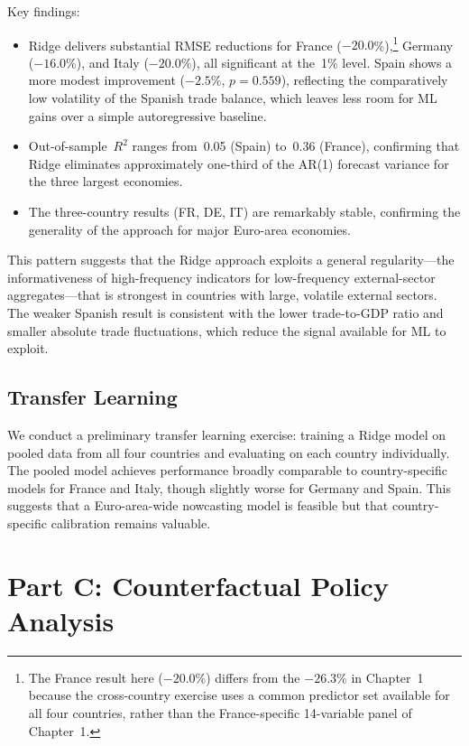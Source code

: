 Key findings:
\begin{itemize}
  \item Ridge delivers substantial RMSE reductions for France ($-20.0$\%),\footnote{The France result here ($-20.0$\%) differs from the $-26.3$\% in Chapter~1 because the cross-country exercise uses a common predictor set available for all four countries, rather than the France-specific 14-variable panel of Chapter~1.} Germany ($-16.0$\%), and Italy ($-20.0$\%), all significant at the~1\% level.  Spain shows a more modest improvement ($-2.5$\%, $p = 0.559$), reflecting the comparatively low volatility of the Spanish trade balance, which leaves less room for ML gains over a simple autoregressive baseline.
  \item Out-of-sample~$R^2$ ranges from~0.05 (Spain) to~0.36 (France), confirming that Ridge eliminates approximately one-third of the AR(1) forecast variance for the three largest economies.
  \item The three-country results (FR, DE, IT) are remarkably stable, confirming the generality of the approach for major Euro-area economies.
\end{itemize}

This pattern suggests that the Ridge approach exploits a general regularity---the informativeness of high-frequency indicators for low-frequency external-sector aggregates---that is strongest in countries with large, volatile external sectors.  The weaker Spanish result is consistent with the lower trade-to-GDP ratio and smaller absolute trade fluctuations, which reduce the signal available for ML to exploit.

\subsection{Transfer Learning}

We conduct a preliminary transfer learning exercise: training a Ridge model on pooled data from all four countries and evaluating on each country individually.  The pooled model achieves performance broadly comparable to country-specific models for France and Italy, though slightly worse for Germany and Spain.  This suggests that a Euro-area-wide nowcasting model is feasible but that country-specific calibration remains valuable.


\section{Part C: Counterfactual Policy Analysis}
\label{sec:ch3_policy}

